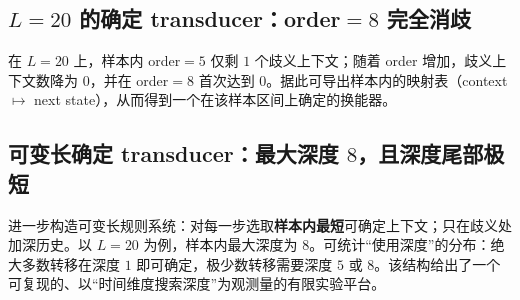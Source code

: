 \begin{table}[H]
\centering

\caption{Pareto 点（由脚本自动生成）。}
\end{table}

\subsection{\texorpdfstring{$L=20$}{L=20} 的确定 transducer：order\texorpdfstring{$=8$}{=8} 完全消歧}

在 $L=20$ 上，样本内 order$=5$ 仅剩 $1$ 个歧义上下文；随着 order 增加，歧义上下文数降为 $0$，并在 order$=8$ 首次达到 $0$。据此可导出样本内的映射表（context $\mapsto$ next state），从而得到一个在该样本区间上确定的换能器。

\subsection{可变长确定 transducer：最大深度 \texorpdfstring{$8$}{8}，且深度尾部极短}

进一步构造可变长规则系统：对每一步选取\textbf{样本内最短}可确定上下文；只在歧义处加深历史。以 $L=20$ 为例，样本内最大深度为 $8$。可统计“使用深度”的分布：绝大多数转移在深度 $1$ 即可确定，极少数转移需要深度 $5$ 或 $8$。该结构给出了一个可复现的、以“时间维度搜索深度”为观测量的有限实验平台。

\begin{table}[H]
\centering

\caption{可变长换能器在不同深度下的使用频率（由脚本自动生成）。}
\end{table}

